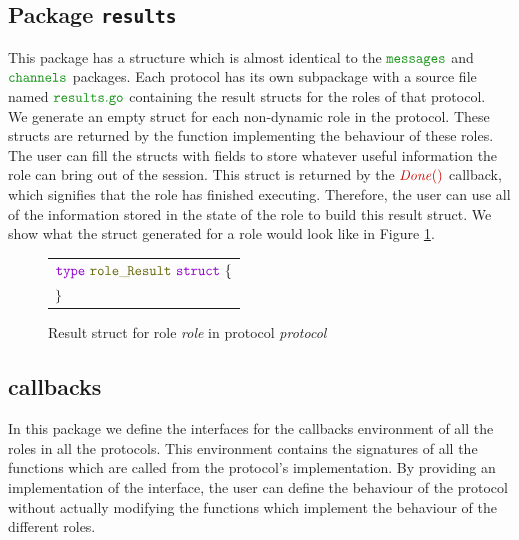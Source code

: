 \documentclass[12pt,twoside]{report}
\begin{document}

\subsection{Package \texttt{results}}
This package has a structure which is almost identical to the $\pkgname{messages}$ and $\pkgname{channels}$ packages. Each protocol has its own subpackage with a source file named $\filename{results}$ containing the result structs for the roles of that protocol.\\

We generate an empty struct for each non-dynamic role in the protocol. These structs are returned by the function implementing the behaviour of these roles. The user can fill the structs with fields to store whatever useful information the role can bring out of the session. This struct is returned by the $\functionname{Done()}$ callback, which signifies that the role has finished executing. Therefore, the user can use all of the information stored in the state of the role to build this result struct. We show what the struct generated for a role would look like in Figure \ref{result-struct-gen}.

\begin{figure}[!h]
    \begin{center}
        \begin{tabular}{l}
            $\gotype\ \structname{role\_\!Result}\ \gostruct\ \{$\\[3pt]
            $\}$
        \end{tabular}
    \end{center}
    \caption{Result struct for role \textit{role} in protocol \textit{protocol}}
    \label{result-struct-gen}
\end{figure}

\subsection{callbacks}
In this package we define the interfaces for the callbacks environment of all the roles in all the protocols. This environment contains the signatures of all the functions which are called from the protocol's implementation. By providing an implementation of the interface, the user can define the behaviour of the protocol without actually modifying the functions which implement the behaviour of the different roles.\\
\end{document}
